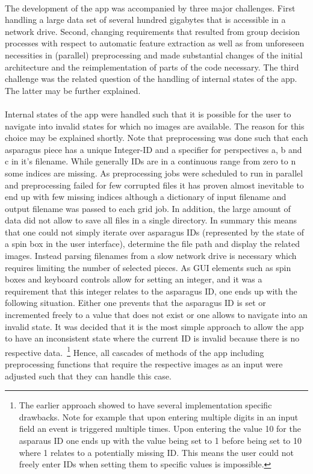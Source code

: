 \\
The development of the app was accompanied by three major challenges. First handling a large data set of several hundred gigabytes that is accessible in a network drive. Second, changing requirements that resulted from group decision processes with respect to automatic feature extraction as well as from unforeseen necessities in (parallel) preprocessing and made substantial changes of the initial architecture and the reimplementation of parts of the code necessary. The third challenge was the related question of the handling of internal states of the app. The latter may be further explained. \\
\\
Internal states of the app were handled such that it is possible for the user to navigate into invalid states for which no images are available. The reason for this choice may be explained shortly. Note that preprocessing was done such that each asparagus piece has a unique Integer-ID and a specifier for perspectives a, b and c in it’s filename. While generally IDs are in a continuous range from zero to n some indices are missing. As preprocessing jobs were scheduled to run in parallel and preprocessing failed for few corrupted files it has proven almost inevitable to end up with few missing indices although a dictionary of input filename and output filename was passed to each grid job. In addition, the large amount of data did not allow to save all files in a single directory. In summary this means that one could not simply iterate over asparagus IDs (represented by the state of a spin box in the user interface), determine the file path and display the related images. Instead parsing filenames from a slow network drive is necessary which requires limiting the number of selected pieces. As GUI elements such as spin boxes and keyboard controls allow for setting an integer, and it was a requirement that this integer relates to the asparagus ID, one ends up with the following situation. Either one prevents that the asparagus ID is set or incremented freely to a value that does not exist or one allows to navigate into an invalid state. It was decided that it is the most simple approach to allow the app to have an inconsistent state where the current ID is invalid because there is no respective data.~\footnote{The earlier approach showed to have several implementation specific drawbacks. Note for example that upon entering multiple digits in an input field an event is triggered multiple times. Upon entering the value 10 for the asparaus ID one ends up with the value being set to 1 before being set to 10 where 1 relates to a potentially missing ID. This means the user could not freely enter IDs when setting them to specific values is impossible.} Hence, all cascades of methods of the app including preprocessing functions that require the respective images as an input were adjusted such that they can handle this case. \\

